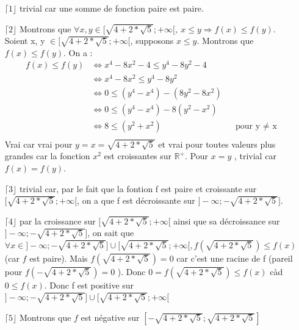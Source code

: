 \documentclass[a4paper, 12pt]{article}
\begin{document}
\begin{itemize}
	\item[\(\lceil 1 \rfloor\)] trivial car une somme de fonction paire est paire.
	\item[\(\lceil 2 \rfloor\)] Montrons que \( \forall x, y \in [ \sqrt{4 + 2 * \sqrt{5}} ; +\infty [, ~ x \leq y \Rightarrow f(x) \leq f(y) \). \newline
	Soient x, y \( \in [ \sqrt{4 + 2 * \sqrt{5}} ; +\infty [ \), supposons \( x \leq y \). Montrons que \( f(x) \leq f(y) \). \newline On a :
	\begin{align*}
		f(x) \leq f(y) &\Leftrightarrow x^4 - 8x^2 - 4 \leq y^4 - 8y^2 - 4 \\
		&\Leftrightarrow x^4 - 8x^2 \leq y^4 - 8y^2 \\
		&\Leftrightarrow 0 \leq (y^4 - x^4) - (8y^2 - 8x^2) \\
		&\Leftrightarrow 0 \leq (y^4 - x^4) - 8(y^2 - x^2) \\
		&\Leftrightarrow 8 \leq (y^2 + x^2) &&\text{pour y $\neq$ x} \\
	\end{align*}
Vrai car vrai pour $ y = x = \sqrt{4+2*\sqrt{5}}$ et vrai pour toutes valeurs plus grandes car la fonction $x^2$ est croissantes sur $\mathbb{R}^+$. Pour $x=y$ , trivial car $f(x)=f(y)$.	
	\item[\(\lceil 3 \rfloor\)] trivial car, par le fait que la fontion f est paire et croissante sur \( [ \sqrt{4 + 2 * \sqrt{5}} ; +\infty [ \), on a que f est décroissante sur \( ] -\infty ; -\sqrt{4 + 2 * \sqrt{5}} ] \).
	\item[\(\lceil 4 \rfloor\)] par la croissance sur \( [ \sqrt{4 + 2 * \sqrt{5}} ; +\infty [ \) ainsi que sa décroissance sur \( ] -\infty ; -\sqrt{4 + 2 * \sqrt{5}} ] \), on sait que \( \forall x \in ] -\infty ; -\sqrt{4 + 2 * \sqrt{5}} ] \cup [ \sqrt{4 + 2 * \sqrt{5}} ; +\infty [, f \left( \sqrt{4 + 2 * \sqrt{5}}\right) \leq f \left( x \right) \) (car $f$ est paire). Mais \( f \left( \sqrt{4 + 2 * \sqrt{5}} \right) = 0 \) car c'est une racine de f (pareil pour \( f \left( - \sqrt{4 + 2 * \sqrt{5}} \right) = 0 \) ). \newline
	Donc \( 0 = f \left( \sqrt{4 + 2 * \sqrt{5}} \right) \leq f \left( x \right) \) càd \( 0 \leq f \left( x \right) \). Donc f est positive sur \( ] -\infty ; -\sqrt{4 + 2 * \sqrt{5}} ] \cup [ \sqrt{4 + 2 * \sqrt{5}} ; +\infty [ \)
	\item[\(\lceil 5 \rfloor\)] Montrons que $f$ est négative sur $ [ -\sqrt{4 + 2 * \sqrt{5}} ; \sqrt{4 + 2 * \sqrt{5}} ] $

\end{itemize}
\end{document}
